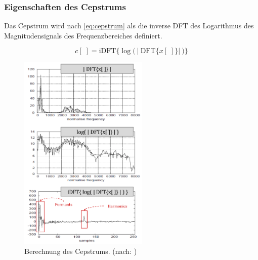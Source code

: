 \subsubsection{Eigenschaften des Cepstrums}
\label{sec:vad_ceps_features}

Das Cepstrum wird nach \autoref{eq:cepstrum} als die inverse DFT des Logarithmus des Magnitudensignals des Frequenzbereiches definiert.\cite[\emph{Cepstral Analysis}, S. 2]{ricardo_ceps}

\begin{equation}
c[\;] =  \text{iDFT}\Big\{ \log \Big(\ \big|\ \text{DFT}\{x[\;]\} \big|\ \Big) \Big\}
\label{eq:cepstrum}
\end{equation}	

\begin{figure}[h]
	\centering
	\includegraphics[width=0.55\textwidth]{bilder/cepstrum04.png}
	\caption[Berechnung des Cepstrums]{Berechnung des Cepstrums. (nach: \cite[\emph{Cepstral Analysis}, S. 3]{ricardo_ceps})}
	\label{img:cepstrumOverview}
\end{figure}

